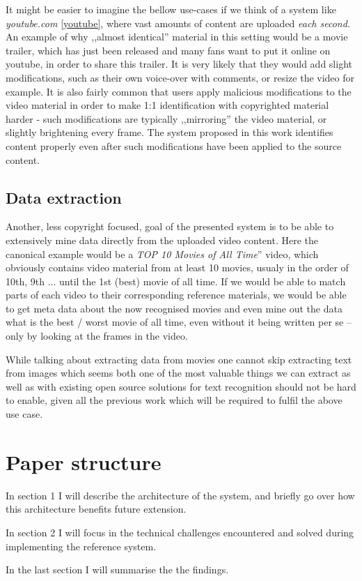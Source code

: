 It might be easier to imagine the bellow use-cases if we think of a system like \textit{youtube.com} \ref{youtube}, where vast amounts of content are uploaded \textit{each second}. An example of why ,,almost identical'' material in this setting would be a movie trailer, which has just been released and many fans want to put it online on youtube, in order to share this trailer. It is very likely that they would add slight modifications, such as their own voice-over with comments, or resize the video for example. It is also fairly common that users apply malicious modifications to the video material in order to make 1:1 identification with copyrighted material harder - such modifications are typically ,,mirroring'' the video material, or slightly brightening every frame. The system proposed in this work identifies content properly even after such modifications have been applied to the source content.

\subsection{Data extraction}

Another, less copyright focused, goal of the presented system is to be able to extensively mine data directly from the uploaded video content.
Here the canonical example would be a \textit{TOP 10 Movies of All Time}'' video, which obviously contains video material from at least 10 movies,
usualy in the order of 10th, 9th ... until the 1st (best) movie of all time. If we would be able to match parts of each video to their corresponding 
reference materials, we would be able to get meta data about the now recognised movies and even mine out the data what is the best / worst movie of all time,
even without it being written per se -- only by looking at the frames in the video. 

While talking about extracting data from movies one cannot skip extracting text from images which seems both one of the most valuable things we can extract as well as with existing open source solutions for text recognition should not be hard to enable, given all the previous work which will be required to fulfil the above use case.

\section{Paper structure}
In section 1 I will describe the architecture of the system, and briefly go over how this architecture benefits future extension.

In section 2 I will focus in the technical challenges encountered and solved during implementing the reference system.

In the last section I will summarise the the findings.


